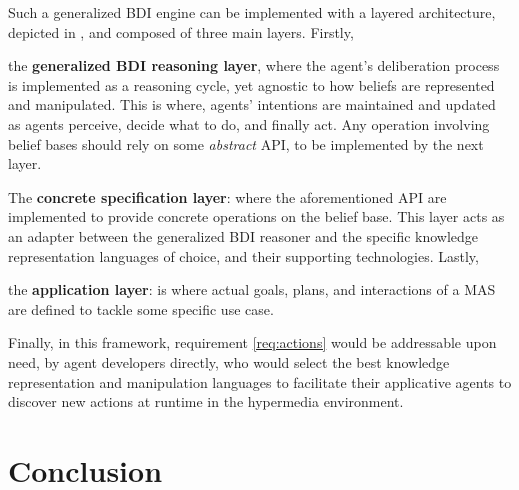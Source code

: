 \documentclass[
]{ceurart}
\begin{document}
Such a generalized \ac{BDI} engine can be implemented with a layered architecture, 
depicted in , and composed of three main layers.
%
Firstly,
\begin{enumerate*}[label={\arabic*.}]
  \item the \textbf{generalized \ac{BDI} reasoning layer},
  where the agent's deliberation process is implemented as a reasoning cycle,
  yet agnostic to how beliefs are represented and manipulated.
  This is where,
  agents' intentions are maintained
  and updated as agents perceive,
  decide what to do,
  and finally act.
  Any operation involving belief bases should rely on some \emph{abstract} \acs{API},
  to be implemented by the next layer.
  \item The \textbf{concrete specification layer}: 
  where the aforementioned \acs{API} are implemented to provide concrete operations on the belief base.
  This layer acts as an adapter between the generalized \ac{BDI} reasoner
  and the specific knowledge representation languages of choice,
  and their supporting technologies.
  Lastly,
  \item the \textbf{application layer}: 
  is where actual goals, plans, and interactions of a \ac{MAS} are defined 
  to tackle some specific use case.
\end{enumerate*}


Finally,
in this framework,
requirement \ref{req:actions} would be addressable upon need,
by agent developers directly,
who would select the best knowledge representation and manipulation languages 
to facilitate their applicative agents to discover new actions at runtime in the hypermedia environment.

\section{Conclusion}
\label{sec:conclusion}

\end{document}
